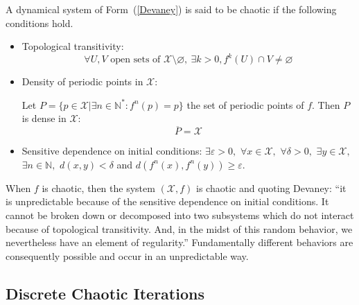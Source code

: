 \documentclass[journal]{IEEEtran}
\begin{document}
\begin{definition}
 A dynamical system of Form~(\ref{Devaney}) is said to be chaotic if the following conditions hold.
\begin{itemize}
\item Topological transitivity:
\begin{equation}
\forall U,V \textrm{ open sets of } \mathcal{X}\setminus \varnothing, ~\exists k>0, f^k(U) \cap V \neq \varnothing
\end{equation}
\item Density of periodic points in $\mathcal{X}$:

Let $P=\{p\in \mathcal{X}|\exists n \in \mathds{N}^{\ast}:f^n(p)=p\}$ the set of periodic points of $f$. Then $P$ is dense in $\mathcal{X}$:
\begin{equation}
 \overline{P}=\mathcal{X}
\end{equation}

\item Sensitive dependence on initial conditions:
$\exists \varepsilon>0,$ $\forall x \in \mathcal{X},$ $\forall \delta >0,$ $\exists y \in \mathcal{X},$ $\exists n \in \mathbb{N},$ $d(x,y)<\delta$ and $d\left(f^n(x),f^n(y)\right) \geqslant \varepsilon.$
\end{itemize}

\end{definition}
When $f$ is chaotic, then the system $(\mathcal{X}, f)$ is chaotic and quoting Devaney: ``it is unpredictable because of the sensitive dependence on initial conditions. It cannot be broken down or decomposed into two subsystems which do not interact because of topological transitivity. And, in the midst of this random behavior, we nevertheless have an element of regularity.'' Fundamentally different  behaviors  are  consequently possible and occur in an unpredictable way.





\subsection{Discrete Chaotic Iterations}
\label{Chaotic iterations}
\end{document}
